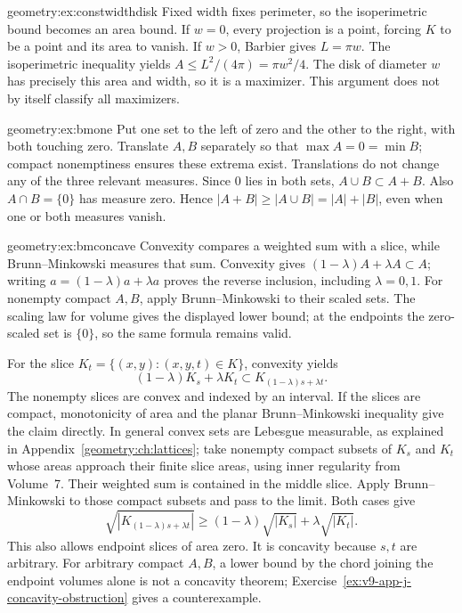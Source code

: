 \begin{solution}{geometry:ex:constwidthdisk}
\idea Fixed width fixes perimeter, so the isoperimetric bound becomes an area bound.
\writeup If $w=0$, every projection is a point, forcing $K$ to be a point and its area to vanish. If $w>0$, Barbier gives $L=\pi w$. The isoperimetric inequality yields
$A\le L^2/(4\pi)=\pi w^2/4$. The disk of diameter $w$ has precisely this area and width, so it is a maximizer. This argument does not by itself classify all maximizers.
\end{solution}

\begin{solution}{geometry:ex:bmone}
\idea Put one set to the left of zero and the other to the right, with both touching zero.
\writeup Translate $A,B$ separately so that $\max A=0=\min B$; compact nonemptiness ensures these extrema exist. Translations do not change any of the three relevant measures. Since $0$ lies in both sets, $A\cup B\subset A+B$. Also $A\cap B=\{0\}$ has measure zero. Hence $|A+B|\ge|A\cup B|=|A|+|B|$, even when one or both measures vanish.
\end{solution}

\begin{solution}{geometry:ex:bmconcave}
\idea Convexity compares a weighted sum with a slice, while Brunn--Minkowski measures that sum.
\writeup Convexity gives $(1-\lambda)A+\lambda A\subset A$; writing $a=(1-\lambda)a+\lambda a$ proves the reverse inclusion, including $\lambda=0,1$. For nonempty compact $A,B$, apply Brunn--Minkowski to their scaled sets. The scaling law for volume gives the displayed lower bound; at the endpoints the zero-scaled set is $\{0\}$, so the same formula remains valid.

For the slice $K_t=\{(x,y):(x,y,t)\in K\}$, convexity yields
\[
(1-\lambda)K_s+\lambda K_t\subset K_{(1-\lambda)s+\lambda t}.
\]
The nonempty slices are convex and indexed by an interval. If the slices are compact, monotonicity of area and the planar Brunn--Minkowski inequality give the claim directly. In general convex sets are Lebesgue measurable, as explained in Appendix~\ref{geometry:ch:lattices}; take nonempty compact subsets of $K_s$ and $K_t$ whose areas approach their finite slice areas, using inner regularity from Volume~7. Their weighted sum is contained in the middle slice. Apply Brunn--Minkowski to those compact subsets and pass to the limit. Both cases give
\[
\sqrt{|K_{(1-\lambda)s+\lambda t}|}
\ge(1-\lambda)\sqrt{|K_s|}+\lambda\sqrt{|K_t|}.
\]
This also allows endpoint slices of area zero. It is concavity because $s,t$ are arbitrary. For arbitrary compact $A,B$, a lower bound by the chord joining the endpoint volumes alone is not a concavity theorem; Exercise~\ref{ex:v9-app-j-concavity-obstruction} gives a counterexample.
\end{solution}

